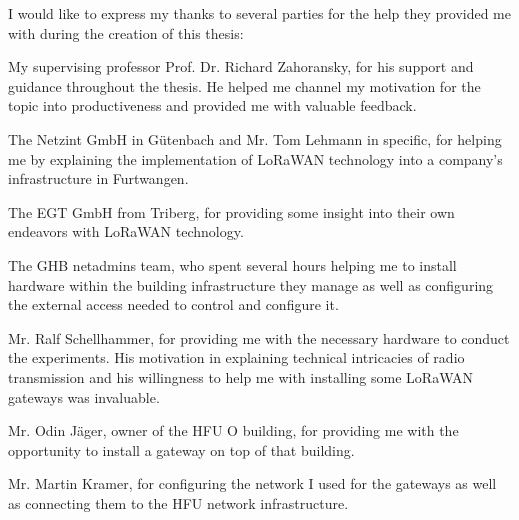 I would like to express my thanks to several parties for the help they provided me with during the creation of this thesis:

My supervising professor Prof. Dr. Richard Zahoransky, for his support and guidance throughout the thesis.
He helped me channel my motivation for the topic into productiveness and provided me with valuable feedback.

The Netzint GmbH in Gütenbach and Mr. Tom Lehmann in specific, for helping me by explaining the implementation of \ac{LoRaWAN} technology into a company's infrastructure in Furtwangen.

The EGT GmbH from Triberg, for providing some insight into their own endeavors with \ac{LoRaWAN} technology.

The \ac{GHB} netadmins team, who spent several hours helping me to install hardware within the building infrastructure they manage as well as configuring the external access needed to control and configure it.

Mr. Ralf Schellhammer, for providing me with the necessary hardware to conduct the experiments.
His motivation in explaining technical intricacies of radio transmission and his willingness to help me with installing some \ac{LoRaWAN} gateways was invaluable.

Mr. Odin Jäger, owner of the \ac{HFU} O building, for providing me with the opportunity to install a gateway on top of that building.

Mr. Martin Kramer, for configuring the network I used for the gateways as well as connecting them to the \ac{HFU} network infrastructure.